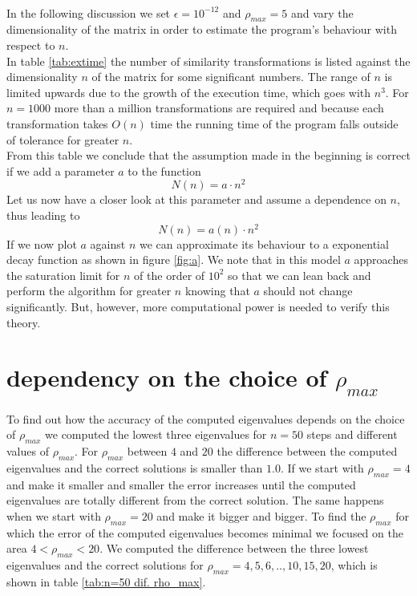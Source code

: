 \documentclass[11pt,a4wide]{article}
\begin{document}
\\
In the following discussion we set $\epsilon=10^{-12}$ and $\rho_ {max}=5$ and vary the dimensionality of the matrix in order to estimate the program's behaviour with respect to $n$.
\\
In table \ref{tab:extime} the number of similarity transformations is listed against the dimensionality $n$ of the matrix for some significant numbers. The range of $n$ is limited upwards due to the growth of the execution time, which goes with $n^3$. For $n=1000$ more than a million transformations are required and because each transformation takes $O(n)$ time the running time of the program falls outside of tolerance for greater $n$.
\\
From this table we conclude that the assumption made in the beginning is correct if we add a parameter $a$ to the function 
\begin{equation}
N(n)=a\cdot n^2
\label{eq:behofn}
\end{equation}
Let us now have a closer look at this parameter and assume a dependence on $n$, thus leading to
\begin{equation}
N(n)=a(n)\cdot n^2
\label{eq:a(n)}
\end{equation}
If we now plot $a$ against $n$ we can approximate its behaviour to a exponential decay function as shown in figure \ref{fig:a}. We note that in this model $a$ approaches the saturation limit for $n$ of the order of $10^2$ so that we can lean back and perform the algorithm for greater $n$ knowing that $a$ should not change significantly. But, however, more computational power is needed to verify this theory.

\section{dependency on the choice of $\rho_{max}$}
To find out how the accuracy of the computed eigenvalues depends on the choice of $\rho_{max}$ we computed the lowest three eigenvalues for $n=50$ steps and different values of $\rho_{max}$. For $\rho_{max}$ between $4$ and $20$ the difference between the computed eigenvalues and the correct solutions is smaller than $1.0$. If we start with $\rho_{max}=4$ and make it smaller and smaller the error increases until the computed eigenvalues are totally different from the correct solution. The same happens when we start with $\rho_{max}=20$ and make it bigger and bigger. To find the $\rho_{max}$ for which the error of the computed eigenvalues becomes minimal we focused on the area $4<\rho_{max}<20$. We computed the difference between the three lowest eigenvalues and the correct solutions for $\rho_{max}=4,5,6,..,10,15,20$, which is shown in table \ref{tab:n=50 dif. rho_max}.
\end{document}
